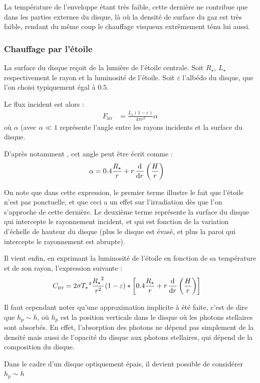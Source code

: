 \begin{remarque}
La température de l'enveloppe étant très faible, cette dernière ne contribue que dans les parties externes du disque, là où la densité de surface du gaz est très faible, rendant du même coup le chauffage visqueux extrêmement ténu lui aussi.
\end{remarque}

\subsubsection{Chauffage par l'étoile}\label{sec:irradiation}
La surface du disque reçoit de la lumière de l'étoile centrale. Soit $R_\star$, $L_\star$ respectivement le rayon et la luminosité de l'étoile. Soit $\varepsilon$ l'albédo du disque, que l'on choisi typiquement égal à $0.5$. 

Le flux incident est alors \citep[eq. (7)]{menou2004low} : 
\begin{align}
F_\text{irr} &= \frac{L_\star(1-\varepsilon)}{4\pi r^2} \alpha
\end{align}
où $\alpha$ (avec $\alpha\ll 1$ représente l'angle entre les rayons incidents et la surface du disque. 

D'après notamment \cite[eq. (5)]{chiang1997spectral}, cet angle peut être écrit comme : 
\begin{align}
\alpha &= 0.4 \frac{R_\star}{r} + r \mathinner{ \dfrac{\operatorname{d \!}{^{}}}{\operatorname{d \!}{{r}^{}}} }\left(\frac{H}{r}\right)
\end{align}

On note que dans cette expression, le premier terme illustre le fait que l'étoile n'est pas ponctuelle, et que ceci a un effet sur l'irradiation dès que l'on s'approche de cette dernière. Le deuxième terme représente la surface du disque qui intercepte le rayonnement incident, et qui est fonction de la variation d'échelle de hauteur du disque (plus le disque est évasé, et plus la paroi qui intercepte le rayonnement est abrupte). 

Il vient enfin, en exprimant la luminosité de l'étoile en fonction de sa température et de son rayon, l'expression suivante :
\begin{align}
C_\text{irr} &= 2 \sigma {T_\star}^4 \frac{{R_\star}^2}{r^2} (1-\varepsilon) * \left[0.4 \frac{R_\star}{r} + r \mathinner{ \dfrac{\operatorname{d \!}{^{}}}{\operatorname{d \!}{{r}^{}}} }\left(\frac{H}{r}\right)\right]
\end{align}

\begin{remarque}
Il faut cependant noter qu'une approximation implicite à été faite, c'est de dire que $h_p\sim h$, où $h_p$ est la position verticale dans le disque où les photons stellaires sont absorbés. En effet, l'absorption des photons ne dépend pas simplement de la densité mais aussi de l'opacité du disque aux photons stellaires, qui dépend de la composition du disque.

Dans le cadre d'un disque optiquement épais, il devient possible de considérer $h_p \sim h$
\end{remarque}

